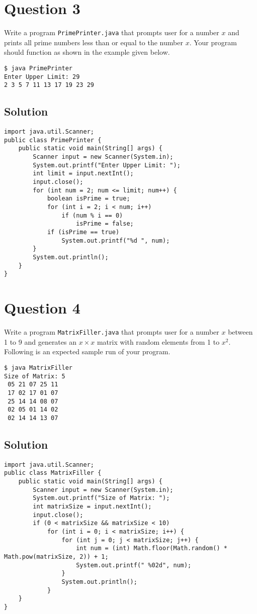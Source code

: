 \section*{Question 3}
Write a program \texttt{PrimePrinter.java} that prompts user for a number $x$ and prints all prime numbers less than or equal to the number $x$.
Your program should function as shown in the example given below.

\begin{verbatim}
$ java PrimePrinter
Enter Upper Limit: 29
2 3 5 7 11 13 17 19 23 29
\end{verbatim}

\subsection*{Solution}
\lstset{language=Java,tabsize=2}
\begin{lstlisting}
import java.util.Scanner;
public class PrimePrinter {
	public static void main(String[] args) {
		Scanner input = new Scanner(System.in);
		System.out.printf("Enter Upper Limit: ");
		int limit = input.nextInt();
		input.close();
		for (int num = 2; num <= limit; num++) {
			boolean isPrime = true;
			for (int i = 2; i < num; i++)
				if (num % i == 0)
					isPrime = false;
			if (isPrime == true)
				System.out.printf("%d ", num);
		}
		System.out.println();
	}
}
\end{lstlisting}

\section*{Question 4}
Write a program \texttt{MatrixFiller.java} that prompts user for a number $x$ between 1 to 9 and generates an $x \times x$ matrix with random elements from 1 to $x^2$.
Following is an expected sample run of your program.

\begin{verbatim}
$ java MatrixFiller
Size of Matrix: 5
 05 21 07 25 11
 17 02 17 01 07
 25 14 14 08 07
 02 05 01 14 02
 02 14 14 13 07
\end{verbatim}

\subsection*{Solution}
\lstset{language=Java,tabsize=2}
\begin{lstlisting}
import java.util.Scanner;
public class MatrixFiller {
	public static void main(String[] args) {
		Scanner input = new Scanner(System.in);
		System.out.printf("Size of Matrix: ");
		int matrixSize = input.nextInt();
		input.close();
		if (0 < matrixSize && matrixSize < 10)
			for (int i = 0; i < matrixSize; i++) {
				for (int j = 0; j < matrixSize; j++) {
					int num = (int) Math.floor(Math.random() * Math.pow(matrixSize, 2)) + 1;
					System.out.printf(" %02d", num);
				}
				System.out.println();
			}
	}
}
\end{lstlisting}

